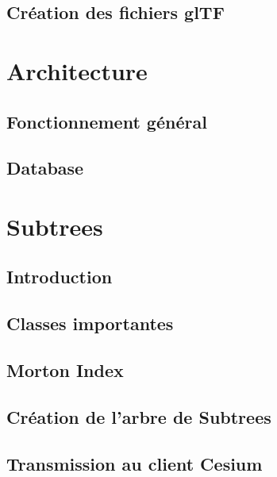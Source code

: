 \documentclass[
    TIC, %
    il, %
]{heig-tb}
\begin{document}
\newpage
\section{Création des fichiers glTF}
\label{sec:gltf}


\newpage
\chapter{Architecture}

\section{Fonctionnement général}
\label{sec:architecture}


\newpage
\section{Database}
\label{sec:database}


\newpage
\chapter{Subtrees}

\section{Introduction}
\label{sec:subtrees-intro}


\newpage
\section{Classes importantes}
\label{sec:classes}


\newpage
\section{Morton Index}
\label{sec:morton}


\newpage
\section{Création de l'arbre de Subtrees}
\label{sec:subtree-creation}


\newpage
\section{Transmission au client Cesium}
\label{sec:transmission}

\end{document}
